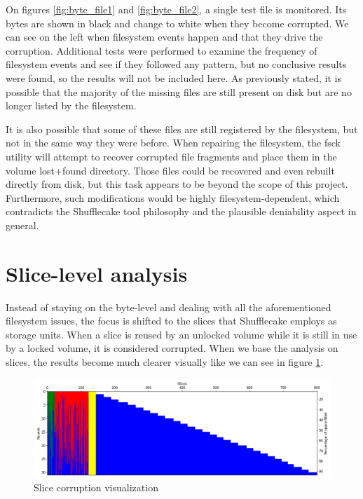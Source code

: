 \documentclass[a4paper,11pt,oneside]{report}
\begin{document}
On figures \ref{fig:byte_file1} and \ref{fig:byte_file2}, a single test file is monitored. Its bytes are shown in black and change to white when they become corrupted. We can see on the left when filesystem events happen and that they drive the corruption. Additional tests were performed to examine the frequency of filesystem events and see if they followed any pattern, but no conclusive results were found, so the results will not be included here. As previously stated, it is possible that the majority of the missing files are still present on disk but are no longer listed by the filesystem.

It is also possible that some of these files are still registered by the filesystem, but not in the same way they were before. When repairing the filesystem, the fsck utility will attempt to recover corrupted file fragments and place them in the volume lost+found directory. Those files could be recovered and even rebuilt directly from disk, but this task appears to be beyond the scope of this project. Furthermore, such modifications would be highly filesystem-dependent, which contradicts the Shufflecake tool philosophy and the plausible deniability aspect in general.

\section{Slice-level analysis}

Instead of staying on the byte-level and dealing with all the aforementioned filesystem issues, the focus is shifted to the slices that Shufflecake employs as storage units. When a slice is reused by an unlocked volume while it is still in use by a locked volume, it is considered corrupted. When we base the analysis on slices, the results become much clearer visually like we can see in figure \ref{fig:slice_visual}.

\begin{figure}[ht]
\centering
\includegraphics[width=\textwidth]{Figures/visual_slice_corruption.png}
\caption{Slice corruption visualization}
\label{fig:slice_visual}
\end{figure}
\end{document}
